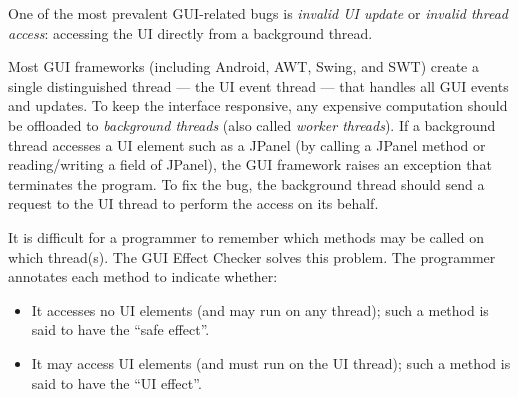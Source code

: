 \htmlhr
{}

One of the most prevalent GUI-related bugs is \emph{invalid UI update} or \emph{invalid thread access}:  accessing the UI directly from a
background thread.



Most GUI frameworks (including Android, AWT, Swing, and SWT) create
a single distinguished thread --- the UI event thread
--- that handles all GUI events and updates.
To keep the interface responsive, any expensive computation should be
offloaded to \emph{background threads} (also called \emph{worker threads}).
If a background thread accesses a UI
element such as a JPanel (by calling a JPanel method or reading/writing a
field of JPanel),
the GUI framework raises an exception that terminates the program.
To fix the bug, the background thread should send a request to the
UI thread to perform the access on its behalf.

It is difficult for a programmer to remember which methods may be called on
which thread(s).
The GUI Effect Checker solves this problem.
The programmer annotates each method to indicate whether:
\begin{itemize}
\item
  It accesses no UI elements (and may run on any thread);
  such a method is said to have the ``safe effect''.
\item
  It may access UI elements (and must run on the UI thread);
  such a method is said to have the ``UI effect''.
\end{itemize}


